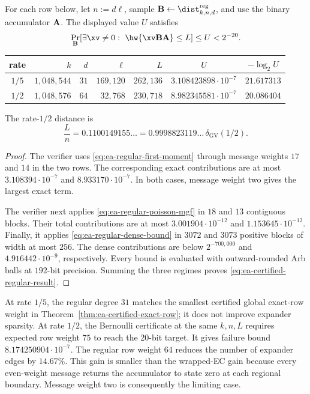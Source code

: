 \begin{theorem}
\label{thm:ea-certified-regular}
For each row below, let $n:=d\ell$, sample
$\B\gets\dist^{\mathrm{reg}}_{k,n,d}$, and use the binary accumulator $\mathbf A$.
The displayed value $U$ satisfies
\begin{equation}
 \Pr_{\B}[\exists\xv\ne0:\ \hw{\xv\B\A}\leq L]
 \leq U<2^{-20}.
 \label{eq:ea-certified-regular-result}
\end{equation}
\begin{center}
\begin{tabular}{c|r|r|r|r|c|c}
rate &$k$ &$d$ &$\ell$ &$L$ &$U$ &$-\log_2U$\\
\hline
$1/5$ &$1{,}048{,}544$ &$31$ &$169{,}120$ &$262{,}136$
 &$3.108423898\cdot10^{-7}$ &$21.617313$\\
$1/2$ &$1{,}048{,}576$ &$64$ &$32{,}768$ &$230{,}718$
 &$8.982345581\cdot10^{-7}$ &$20.086404$
\end{tabular}
\end{center}
The rate-$1/2$ distance is
\[
 \frac{L}{n}=0.1100149155\ldots
 =0.9998823119\ldots\,\delta_{\mathrm{GV}}(1/2).
\]
\end{theorem}

\begin{proof}
The verifier  uses
\eqref{eq:ea-regular-first-moment} through message weights $17$ and $14$ in
the two rows.  The corresponding exact contributions are at most
$3.108394\cdot10^{-7}$ and $8.933170\cdot10^{-7}$.  In both cases, message
weight two gives the largest exact term.

The verifier next applies \eqref{eq:ea-regular-poisson-mgf} in $18$ and $13$
contiguous blocks.  Their total contributions are at most
$3.001904\cdot10^{-12}$ and $1.153645\cdot10^{-12}$.  Finally, it applies
\eqref{eq:ea-regular-dense-bound} in $3072$ and $3073$ positive blocks of width
at most $256$.  The dense contributions are below $2^{-700{,}000}$ and
$4.916442\cdot10^{-9}$, respectively.  Every bound is evaluated with
outward-rounded Arb balls at $192$-bit precision.  Summing the three regimes
proves \eqref{eq:ea-certified-regular-result}.
\end{proof}

At rate $1/5$, the regular degree $31$ matches the smallest certified global
exact-row weight in Theorem~\ref{thm:ea-certified-exact-row}; it does not
improve expander sparsity.  At rate $1/2$, the Bernoulli certificate at the
same $k,n,L$ requires expected row weight $75$ to reach the 20-bit target.  It
gives failure bound $8.174250904\cdot10^{-7}$.  The regular row weight $64$
reduces the number of expander edges by $14.67\%$.  This gain is smaller than
the wrapped-EC gain because every even-weight message returns the accumulator
to state zero at each regional boundary.  Message weight two is consequently
the limiting case.
